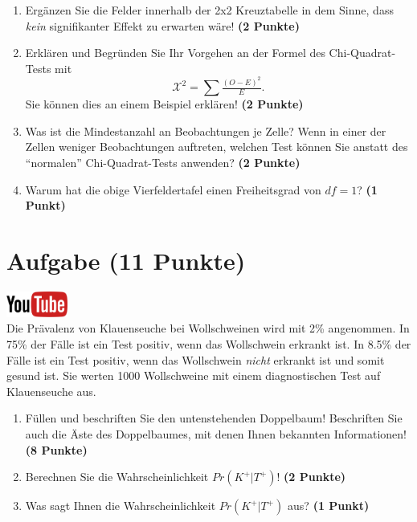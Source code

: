 \documentclass[a4paper, 10pt]{scrartcl}\usepackage[]{graphicx}\usepackage[]{xcolor}
\begin{document}
\begin{enumerate}
\item Erg{\"a}nzen Sie die Felder innerhalb der 2x2 Kreuztabelle in dem Sinne,
  dass \textit{kein} signifikanter Effekt zu erwarten w{\"a}re!
  \textbf{(2 Punkte)}
\item Erkl{\"a}ren und Begr{\"u}nden Sie Ihr Vorgehen an der Formel des
  Chi-Quadrat-Tests mit
  \begin{equation*}
  \mathcal{X}^2 = \sum\tfrac{(O - E)^2}{E}.  
  \end{equation*}
  Sie k{\"o}nnen dies an einem Beispiel erkl{\"a}ren! \textbf{(2 Punkte)}
\item Was ist die Mindestanzahl an Beobachtungen je Zelle? Wenn in einer
  der Zellen weniger Beobachtungen auftreten, welchen Test k{\"o}nnen Sie
  anstatt des "`normalen"' Chi-Quadrat-Tests anwenden? \textbf{(2 Punkte)}
\item Warum hat die obige Vierfeldertafel einen Freiheitsgrad von $df=1$?
  \textbf{(1 Punkt)}
\end{enumerate} 
\clearpage

\section{Aufgabe \hfill (11 Punkte)}

\hfill\href{https://youtu.be/VQlNl8hvRII}{\includegraphics[width =
  2cm]{img/youtube}}\\[1Ex]


Die Pr{\"a}valenz von Klauenseuche bei Wollschweinen wird mit
2\% angenommen. In 75\% der F{\"a}lle ist ein Test positiv, wenn das Wollschwein erkrankt
ist. In 8.5\% der F{\"a}lle ist ein Test positiv,
wenn das Wollschwein \textit{nicht} erkrankt ist und somit gesund ist. Sie
werten 1000 Wollschweine mit einem
diagnostischen Test auf Klauenseuche aus.



\begin{enumerate}
\item F{\"u}llen und beschriften Sie den untenstehenden Doppelbaum! Beschriften
  Sie auch die {\"A}ste des Doppelbaumes, mit denen Ihnen bekannten
  Informationen!  \textbf{(8 Punkte)}
\item Berechnen Sie die Wahrscheinlichkeit $Pr(K^+|T^+)$! \textbf{(2 Punkte)}
\item Was sagt Ihnen die Wahrscheinlichkeit $Pr(K^+|T^+)$ aus? \textbf{(1 Punkt)}
\end{enumerate}
\end{document}

